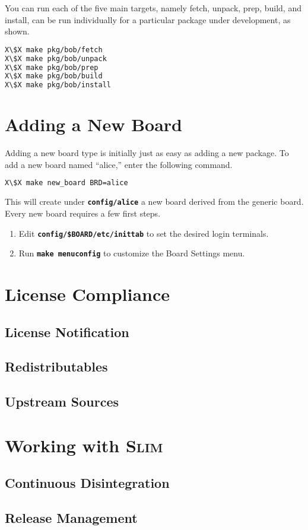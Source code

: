 \documentclass[a4paper,10pt]{article}
\newcommand{\slim}{\textsc{Slim}\xspace}
\newcommand{\fw}{\tt\bf}
\begin{document}
    You can run each of the five main targets, namely fetch, unpack,
    prep, build, and install, can be run individually for a particular
    package under development, as shown.

\begin{lstlisting}[language=bash,escapechar=X]
X\$X make pkg/bob/fetch
X\$X make pkg/bob/unpack
X\$X make pkg/bob/prep
X\$X make pkg/bob/build
X\$X make pkg/bob/install
\end{lstlisting}

\section{Adding a New Board}

    Adding a new board type is initially just as easy as adding a new
    package. To add a new board named ``alice,'' enter the following
    command.

\begin{lstlisting}[language=bash,escapechar=X]
X\$X make new_board BRD=alice
\end{lstlisting}

   This will create under {\fw config/alice} a new board derived from
   the generic board. Every new board requires a few first steps.

   \begin{enumerate}
   \item Edit {\fw config/\$BOARD/etc/inittab} to set the desired login terminals.
   \item Run {\fw make menuconfig} to customize the Board Settings menu.
   \end{enumerate}

\section{License Compliance}
\subsection{License Notification}
\subsection{Redistributables}
\subsection{Upstream Sources}

\section{Working with \slim}
\subsection{Continuous Disintegration}
\subsection{Release Management}



\end{document}
